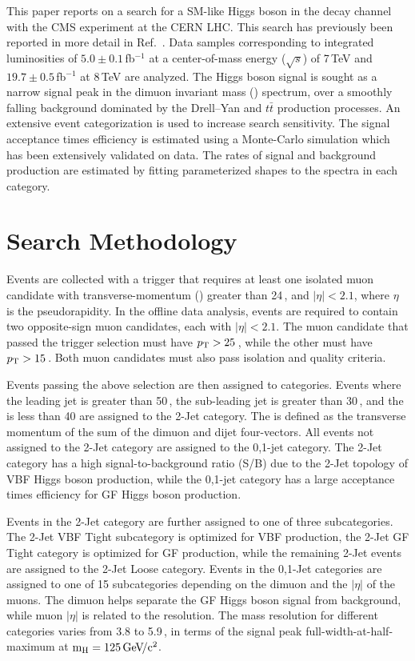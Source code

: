 \documentclass[10pt]{article}
\begin{document}
This paper reports on a search for a SM-like Higgs boson in the \mm{} decay channel 
with the CMS experiment at the CERN LHC.  
This search has previously been reported in more detail in Ref.~\cite{CMS:2013aga}.
Data samples corresponding to integrated luminosities of 
$5.0\pm0.1$\,fb$^{-1}$ at a center-of-mass energy ($\sqrt{s}$) of
7\,TeV and $19.7\pm0.5$\,fb$^{-1}$ at 8\,TeV are analyzed.
The Higgs boson signal is sought as a narrow signal peak in the 
dimuon invariant mass (\Mmumu{}) spectrum, over a smoothly falling
background dominated by the Drell--Yan and $t\bar{t}$ production processes.  
An extensive event categorization is used to increase search sensitivity.  
The signal acceptance times efficiency is estimated using a Monte-Carlo
simulation which has been extensively validated on data.
The rates of signal and background production are estimated by fitting 
parameterized shapes to the \Mmumu{} spectra in each category.

\section{Search Methodology}

Events are collected with a trigger that requires at least one
isolated muon candidate with transverse-momentum (\pt) greater than 24\,\GeVc{},
and $|\eta|<2.1$, where $\eta$ is the pseudorapidity.  In the offline
data analysis, events are required to contain two opposite-sign
muon candidates, each with $|\eta|<2.1$.  The muon candidate that passed 
the trigger selection must have $p_{\mathrm{T}}{}>25$\,\GeVc{}, while the other must 
have $p_{\mathrm{T}}>15$\,\GeVc{}. Both muon candidates must also pass isolation and quality 
criteria.

Events passing the above selection are then assigned to categories.  Events
where the leading jet \pt{} is greater than 50\,\GeVc{}, the sub-leading
jet \pt{} is greater than 30\,\GeVc{}, and the \ptmiss{} is less than 40\GeVc{} 
are assigned to the 2-Jet category.  The \ptmiss{} is defined as the transverse
momentum of the sum of the dimuon and dijet four-vectors.
All events not assigned to the 2-Jet category are assigned to the 0,1-jet category.
The 2-Jet category has a high signal-to-background ratio (S/B) due to the 2-Jet
topology of VBF Higgs boson production, while the 0,1-jet category has a large
acceptance times efficiency for GF Higgs boson production.

Events in the 2-Jet category are further assigned to one of three subcategories.  The 2-Jet
VBF Tight subcategory is optimized for VBF production, the 2-Jet GF Tight
category is optimized for GF production, while the remaining 2-Jet events
are assigned to the 2-Jet Loose category.  Events in the 0,1-Jet categories
are assigned to one of 15 subcategories depending on the dimuon \pt{} and the $|\eta|$
of the muons.  The dimuon \pt{} helps separate the GF Higgs boson signal from background,
while muon $|\eta|$ is related to the \Mmumu{} resolution.  The \Mmumu{}
mass resolution for different categories varies from 3.8 to 5.9\,\GeVcc{}, 
in terms of the signal peak full-width-at-half-maximum at $\mathrm{m_H}=125\,\mathrm{Ge\kern -0.1em V\!/c^2}{}$.
\end{document}
